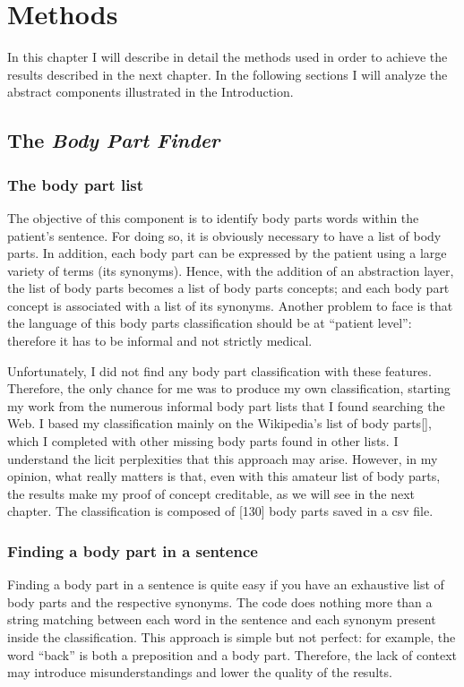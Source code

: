 \chapter{Methods}
\label{cha:methods}
In this chapter I will describe in detail the methods used in order to achieve the results described in the next chapter. In the following sections I will analyze the abstract components illustrated in the Introduction.

\section{The \textit{Body Part Finder}}
\label{sec:body_part_finder}
\subsection{The body part list}
The objective of this component is to identify body parts words within the patient's sentence. For doing so, it is obviously necessary to have a list of body parts. In addition, each body part can be expressed by the patient using a large variety of terms (its synonyms). Hence, with the addition of an abstraction layer, the list of body parts becomes a list of body parts concepts; and each body part concept is associated with a list of its synonyms. Another problem to face is that the language of this body parts classification should be at “patient level”: therefore it has to be informal and not strictly medical.

Unfortunately, I did not find any body part classification with these features. Therefore, the only chance for me was to produce my own classification, starting my work from the numerous informal body part lists that I found searching the Web. I based my classification mainly on the Wikipedia's list of body parts[], which I completed with other missing body parts found in other lists. I understand the licit perplexities that this approach may arise. However, in my opinion, what really matters is that, even with this amateur list of body parts, the results make my proof of concept creditable, as we will see in the next chapter. The classification is composed of [130] body parts saved in a csv file.

\subsection{Finding a body part in a sentence}
Finding a body part in a sentence is quite easy if you have an exhaustive list of body parts and the respective synonyms. The code does nothing more than a string matching between each word in the sentence and each synonym present inside the classification. This approach is simple but not perfect: for example, the word “back” is both a preposition and a body part. Therefore, the lack of context may introduce misunderstandings and lower the quality of the results.

